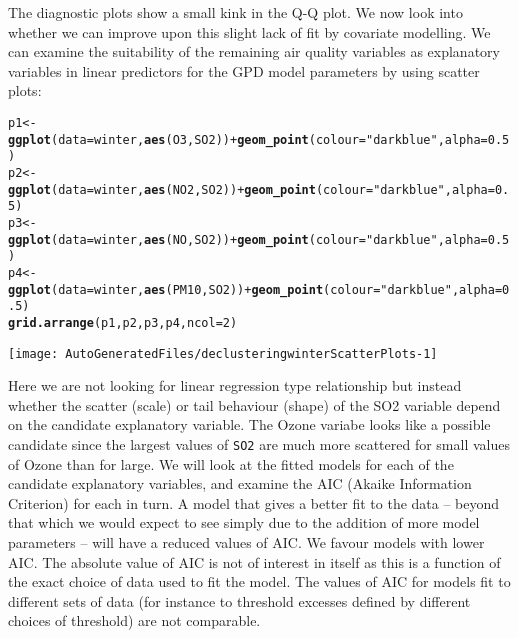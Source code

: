\documentclass[10pt]{article}\usepackage[]{graphicx}\usepackage[]{color}
\makeatletter
\def\maxwidth{ %
  \ifdim\Gin@nat@width>\linewidth
    \linewidth
  \else
    \Gin@nat@width
  \fi
}
\newcommand{\hlnum}[1]{\textcolor[rgb]{0.686,0.059,0.569}{#1}}%
\newcommand{\hlstr}[1]{\textcolor[rgb]{0.192,0.494,0.8}{#1}}%
\newcommand{\hlopt}[1]{\textcolor[rgb]{0,0,0}{#1}}%
\newcommand{\hlstd}[1]{\textcolor[rgb]{0.345,0.345,0.345}{#1}}%
\newcommand{\hlkwb}[1]{\textcolor[rgb]{0.69,0.353,0.396}{#1}}%
\newcommand{\hlkwc}[1]{\textcolor[rgb]{0.333,0.667,0.333}{#1}}%
\newcommand{\hlkwd}[1]{\textcolor[rgb]{0.737,0.353,0.396}{\textbf{#1}}}%
\newenvironment{kframe}{%
 \def\at@end@of@kframe{}%
 \ifinner\ifhmode%
  \def\at@end@of@kframe{\end{minipage}}%
  \begin{minipage}{\columnwidth}%
 \fi\fi%
 \def\FrameCommand##1{\hskip\@totalleftmargin \hskip-\fboxsep
 \colorbox{shadecolor}{##1}\hskip-\fboxsep
     \hskip-\linewidth \hskip-\@totalleftmargin \hskip\columnwidth}%
 \MakeFramed {\advance\hsize-\width
   \@totalleftmargin\z@ \linewidth\hsize
   \@setminipage}}%
 {\par\unskip\endMakeFramed%
 \at@end@of@kframe}
\newenvironment{knitrout}{}{} %
\makeatother
\begin{document}
The diagnostic plots show a small kink in the Q-Q plot.  We now look into whether we can improve upon this slight lack of fit by covariate modelling.  We can examine the suitability of the remaining air quality variables as explanatory variables in linear predictors for the GPD model parameters by using scatter plots:

\begin{knitrout}
\color{fgcolor}\begin{kframe}
\begin{alltt}
\hlstd{p1} \hlkwb{<-} \hlkwd{ggplot}\hlstd{(}\hlkwc{data}\hlstd{=winter,}\hlkwd{aes}\hlstd{(O3,SO2))} \hlopt{+} \hlkwd{geom_point}\hlstd{(}\hlkwc{colour}\hlstd{=}\hlstr{"dark blue"}\hlstd{,}\hlkwc{alpha}\hlstd{=}\hlnum{0.5}\hlstd{)}
\hlstd{p2} \hlkwb{<-} \hlkwd{ggplot}\hlstd{(}\hlkwc{data}\hlstd{=winter,}\hlkwd{aes}\hlstd{(NO2,SO2))} \hlopt{+} \hlkwd{geom_point}\hlstd{(}\hlkwc{colour}\hlstd{=}\hlstr{"dark blue"}\hlstd{,}\hlkwc{alpha}\hlstd{=}\hlnum{0.5}\hlstd{)}
\hlstd{p3} \hlkwb{<-} \hlkwd{ggplot}\hlstd{(}\hlkwc{data}\hlstd{=winter,}\hlkwd{aes}\hlstd{(NO,SO2))} \hlopt{+} \hlkwd{geom_point}\hlstd{(}\hlkwc{colour}\hlstd{=}\hlstr{"dark blue"}\hlstd{,}\hlkwc{alpha}\hlstd{=}\hlnum{0.5}\hlstd{)}
\hlstd{p4} \hlkwb{<-} \hlkwd{ggplot}\hlstd{(}\hlkwc{data}\hlstd{=winter,}\hlkwd{aes}\hlstd{(PM10,SO2))} \hlopt{+} \hlkwd{geom_point}\hlstd{(}\hlkwc{colour}\hlstd{=}\hlstr{"dark blue"}\hlstd{,}\hlkwc{alpha}\hlstd{=}\hlnum{0.5}\hlstd{)}
\hlkwd{grid.arrange}\hlstd{(p1,p2,p3,p4,}\hlkwc{ncol}\hlstd{=}\hlnum{2}\hlstd{)}
\end{alltt}
\end{kframe}
\texttt{[image: AutoGeneratedFiles/declusteringwinterScatterPlots-1]} 

\end{knitrout}

Here we are not looking for linear regression type relationship but instead whether the scatter (scale) or tail behaviour (shape) of the SO2 variable depend on the candidate explanatory variable. The Ozone variabe looks like a possible candidate since the largest values of {\tt SO2} are much more scattered for small values of Ozone than for large.  We will look at the fitted models for each of the candidate explanatory variables, and examine the AIC (Akaike Information Criterion) for each in turn.  A model that gives a better fit to the data -- beyond that which we would expect to see simply due to the addition of more model parameters -- will have a reduced values of AIC.  We favour models with lower AIC.  The absolute value of AIC is not of interest in itself as this is a function of the exact choice of data used to fit the model.  The values of AIC for models fit to different sets of data (for instance to threshold excesses defined by different choices of threshold) are not comparable.
\end{document}
